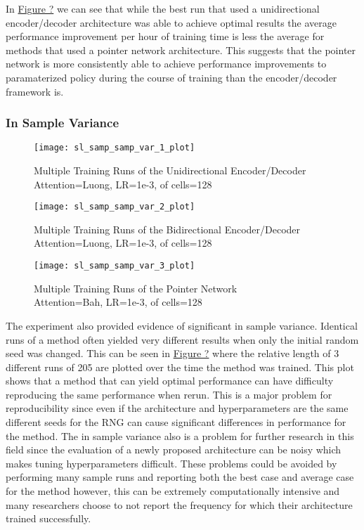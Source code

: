 \documentclass[12pt]{article}
\begin{document}
In \hyperref[fig_sr_trainrate]{Figure ?} we can see that while the best run that used a unidirectional encoder/decoder architecture was able to achieve optimal results the average performance improvement per hour of training time is less the average for methods that used a pointer network architecture. This suggests that the pointer network is more consistently able to achieve performance improvements to paramaterized policy during the course of training than the encoder/decoder framework is.

\subsubsection{In Sample Variance}
\begin{figure}[H]
  \centering
  \texttt{[image: sl\_samp\_samp\_var\_1\_plot]}
  \caption{Multiple Training Runs of the Unidirectional Encoder/Decoder \\ Attention=Luong, LR=1e-3,  of cells=128}
  \label{fig_samp_var}
\end{figure}

\begin{figure}[H]
  \centering
  \texttt{[image: sl\_samp\_samp\_var\_2\_plot]}
  \caption{Multiple Training Runs of the Bidirectional Encoder/Decoder \\ Attention=Luong, LR=1e-3,  of cells=128}
  \label{fig_samp_var}
\end{figure}

\begin{figure}[H]
  \centering
  \texttt{[image: sl\_samp\_samp\_var\_3\_plot]}
  \caption{Multiple Training Runs of the Pointer Network \\ Attention=Bah, LR=1e-3,  of cells=128}
  \label{fig_samp_var}
\end{figure}

The experiment also provided evidence of significant in sample variance. Identical runs of a method often yielded very different results when only the initial random seed was changed. This can be seen in  \hyperref[samp_var]{Figure ?} where the relative length of 3 different runs of 205 are plotted over the time the method was trained. This plot shows that a method that can yield optimal performance can have difficulty reproducing the same performance when rerun. This is a major problem for reproducibility since even if the architecture and hyperparameters are the same different seeds for the RNG can cause significant differences in performance for the method. The in sample variance also is a problem for further research in this field since the evaluation of a newly proposed architecture can be noisy which makes tuning hyperparameters difficult. These problems could be avoided by performing many sample runs and reporting both the best case and average case for the method however, this can be extremely computationally intensive and many researchers choose to not report the frequency for which their architecture trained successfully.
\end{document}
